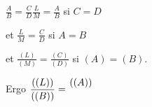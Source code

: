 \pend
\vspace{1.5em}
\pstart
\noindent
{}
\pend
\nobreak
\vspace{0.5em}
\footnotesize	%
\pstart 
\noindent
\rule[0mm]{0pt}{5.5mm}
\hspace{4mm}$\displaystyle\frac{A}{B}=\displaystyle\frac{C}{D}$\quad$\displaystyle\frac{L}{M}=\displaystyle\frac{A}{B}$ si $C=D$\\%
\rule[0mm]{0pt}{5.5mm}
et $\displaystyle\frac{L}{M}=\displaystyle\frac{C}{D}$ si $A=B$\\%
\rule[0mm]{0pt}{5.5mm}
et $\displaystyle\frac{(L)}{(M)}=\displaystyle\frac{(C)}{(D)}$ si $(A)=(B)$.\\%
\rule[0mm]{0pt}{5.5mm}
Ergo $\displaystyle\frac{((L))}{((B))}=\efrac{((A))}{}$ %
\quad%
\normalsize%
\pend

